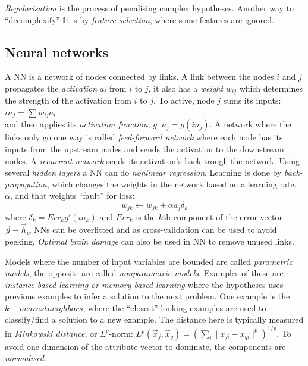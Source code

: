 \documentclass[11pt, letterpaper]{report}
\numberwithin{equation}{section}
\begin{document}
\emph{Regularisation} is the process of penalising complex hypotheses. Another
way to ``decomplexify'' $\mathbb{H}$ is by \emph{feature selection}, where some
features are ignored.

\subsection*{Neural networks}
A NN is a network of nodes connected by links. A link between the nodes $i$ and
$j$ propagates the \emph{activation} $a_i$ from $i$ to $j$, it also has a
\emph{weight} $w_{ij}$ which determines the strength of the activation from $i$
to $j$. To active, node $j$ sums its inputs: $in_j = \sum w_{ij}a_i$ \\ and then
applies its \emph{activation function}, $g$: $a_j = g(in_j)$. A network where
the links only go one way is called \emph{feed-forward network} where each node
has its inputs from the upstream nodes and sends the activation to the
downstream nodes. A \emph{recurrent network} sends its activation's back trough
the network. Using several \emph{hidden layers} a NN can do \emph{nonlinear
  regression}. Learning is done by \emph{back-propagation}, which changes the
weights in the network based on a learning rate, $\alpha$, and that weights
``fault'' for loss:
\setcounter{equation}{10}
\begin{equation}
  \label{eq:backprop}
  w_{jk} \leftarrow w_{jk} + \alpha a_j \delta_k
\end{equation}
where $\delta_k = Err_k g'(in_k)$ and $Err_k$ is the $k$th component of the
error vector $\vec{y}-\vec{h}_w$
NNs can be overfitted and as cross-validation can be used to avoid peeking.
\emph{Optimal brain damage} can also be used in NN to remove unused links.

Models where the number of input variables are bounded are called
\emph{parametric models}, the opposite are called \emph{nonparametric models}.
Examples of these are \emph{instance-based learning or memory-based learning}
where the hypotheses uses previous examples to infer a solution to the next
problem. One example is the $k-nearest neighbors$, where the ``closest'' looking
examples are used to classify/find a solution to a new example. The distance
here is typically measured in \emph{Minkowski distance}, or $L^p$-norm:
$L^p(\vec{x}_j,\vec{x}_q) = (\sum_i \mid x_{ji} - x_{qi} \mid^p)^{1/p}$.
To avoid one dimension of the attribute vector to dominate, the components are \emph{normalised}.
\end{document}

